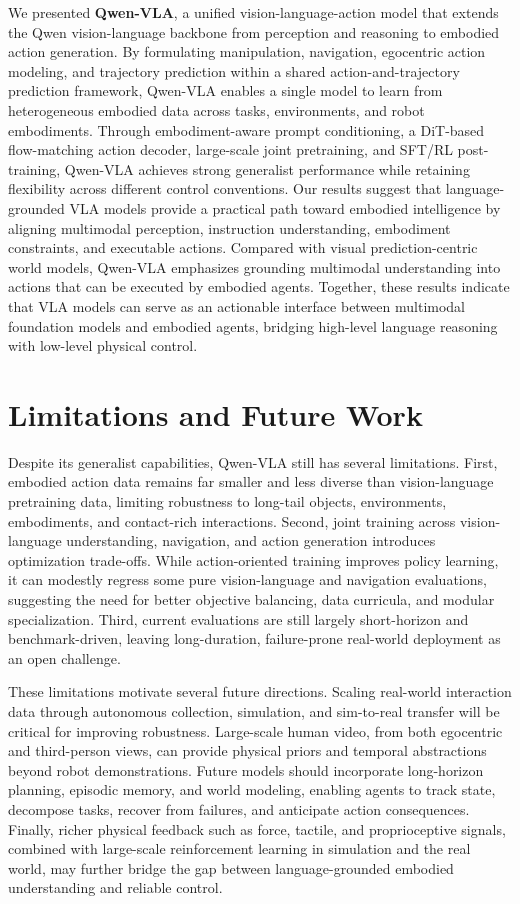 \documentclass{article}
\begin{document}
We presented \textbf{Qwen-VLA}, a unified vision-language-action model that extends the Qwen vision-language backbone from perception and reasoning to embodied action generation. By formulating manipulation, navigation, egocentric action modeling, and trajectory prediction within a shared action-and-trajectory prediction framework, Qwen-VLA enables a single model to learn from heterogeneous embodied data across tasks, environments, and robot embodiments. Through embodiment-aware prompt conditioning, a DiT-based flow-matching action decoder, large-scale joint pretraining, and SFT/RL post-training, Qwen-VLA achieves strong generalist performance while retaining flexibility across different control conventions. Our results suggest that language-grounded VLA models provide a practical path toward embodied intelligence by aligning multimodal perception, instruction understanding, embodiment constraints, and executable actions. Compared with visual prediction-centric world models, Qwen-VLA emphasizes grounding multimodal understanding into actions that can be executed by embodied agents. Together, these results indicate that VLA models can serve as an actionable interface between multimodal foundation models and embodied agents, bridging high-level language reasoning with low-level physical control.


\section{Limitations and Future Work}

Despite its generalist capabilities, Qwen-VLA still has several limitations. First, embodied action data remains far smaller and less diverse than vision-language pretraining data, limiting robustness to long-tail objects, environments, embodiments, and contact-rich interactions. Second, joint training across vision-language understanding, navigation, and action generation introduces optimization trade-offs. While action-oriented training improves policy learning, it can modestly regress some pure vision-language and navigation evaluations, suggesting the need for better objective balancing, data curricula, and modular specialization. Third, current evaluations are still largely short-horizon and benchmark-driven, leaving long-duration, failure-prone real-world deployment as an open challenge.

These limitations motivate several future directions. Scaling real-world interaction data through autonomous collection, simulation, and sim-to-real transfer will be critical for improving robustness. Large-scale human video, from both egocentric and third-person views, can provide physical priors and temporal abstractions beyond robot demonstrations. Future models should incorporate long-horizon planning, episodic memory, and world modeling, enabling agents to track state, decompose tasks, recover from failures, and anticipate action consequences. Finally, richer physical feedback such as force, tactile, and proprioceptive signals, combined with large-scale reinforcement learning in simulation and the real world, may further bridge the gap between language-grounded embodied understanding and reliable control.
\end{document}
